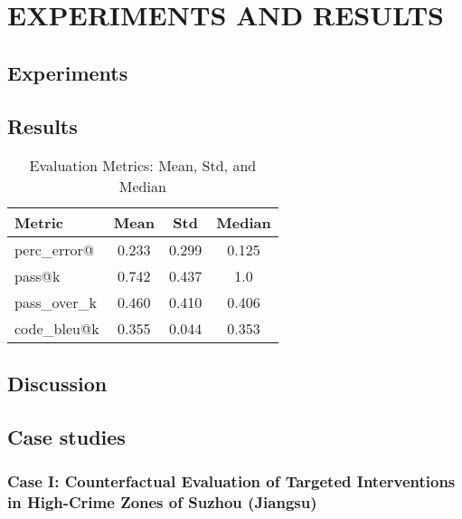 \chapter{ EXPERIMENTS AND RESULTS}


\section{Experiments}

\section{Results}

\begin{table}[h!]
\centering
\caption{Evaluation Metrics: Mean, Std, and Median}
{%
\begin{tabular}{l|ccc}
\toprule
\textbf{Metric} & \textbf{Mean} & \textbf{Std} & \textbf{Median} \\
\midrule
perc\_error@ & 0.233 & 0.299 & 0.125 \\
pass@k    & 0.742 & 0.437 & 1.0   \\
pass\_over\_k  & 0.460 & 0.410 & 0.406 \\
code\_bleu@k  & 0.355 & 0.044 & 0.353 \\
\bottomrule
\end{tabular}
}
\label{tab:metrics_generated}
\end{table}

\section{Discussion}

\section{Case studies}

\subsection{Case I: Counterfactual Evaluation of Targeted Interventions in High-Crime Zones of Suzhou (Jiangsu)}


